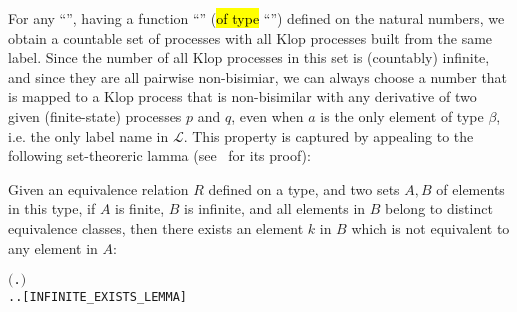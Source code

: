 For any ``'', having a function ``'' (\hl{of type} ``'')
defined on the natural numbers, we obtain a countable set of processes
with all Klop processes built from the same label.
Since the number of all Klop processes in this set is (countably) infinite, and
since they are all pairwise non-bisimiar,
we can always
choose a number that is mapped to a Klop process
that is non-bisimilar with any derivative of two given 
 (finite-state) processes $p$ and $q$,
even when $a$ is the only element of type $\beta$, i.e. the only label name
in $\mathscr{L}$.
This property is captured by appealing to the following set-theoreric
lamma (see~\cite{Tian:2017wrba} for its proof):
\begin{lemma}
Given an equivalence relation $R$ defined on a type, and two sets $A, B$
of elements in this type, 
if $A$ is finite, $B$ is infinite, and all elements
in $B$ belong to distinct equivalence classes, then there exists an element $k$ in $B$
which is not equivalent to any element in $A$:
\begin{alltt}
\HOLTokenTurnstile{}   \HOLSymConst{\HOLTokenImp{}}
     \HOLSymConst{\HOLTokenConj{}}   \HOLSymConst{\HOLTokenConj{}} \ensuremath{(}\HOLSymConst{\HOLTokenForall{}} .  \HOLSymConst{\HOLTokenIn{}}  \HOLSymConst{\HOLTokenConj{}}  \HOLSymConst{\HOLTokenIn{}}  \HOLSymConst{\HOLTokenConj{}}  \HOLSymConst{\HOLTokenNotEqual{}}  \HOLSymConst{\HOLTokenImp{}} \HOLSymConst{\HOLTokenNeg{}}  \ensuremath{)} \HOLSymConst{\HOLTokenImp{}}
   \HOLSymConst{\HOLTokenExists{}}.  \HOLSymConst{\HOLTokenIn{}}  \HOLSymConst{\HOLTokenConj{}} \HOLSymConst{\HOLTokenForall{}}.  \HOLSymConst{\HOLTokenIn{}}  \HOLSymConst{\HOLTokenImp{}} \HOLSymConst{\HOLTokenNeg{}}  \hfill[INFINITE_EXISTS_LEMMA]
\end{alltt}
\end{lemma}

